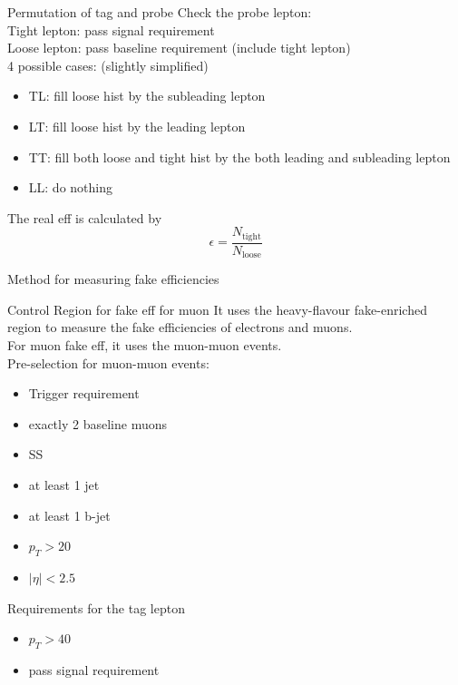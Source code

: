 \documentclass[mathserif,serif]{beamer}
\begin{document}
\begin{frame}{Permutation of tag and probe}
Check the probe lepton: \\
Tight lepton: pass signal requirement \\
Loose lepton: pass baseline requirement (include tight lepton) \\
4 possible cases: (slightly simplified)
\begin{itemize}
\item TL: fill loose hist by the subleading lepton
\item LT: fill loose hist by the leading lepton
\item TT: fill both loose and tight hist by the both leading and subleading lepton
\item LL: do nothing
\end{itemize}
The real eff is calculated by
\begin{equation*}
\epsilon = \frac{N_{\text{tight}}}{N_{\text{loose}}}
\end{equation*}
\end{frame}

\begin{frame}
\begin{center}
\huge
Method for measuring fake efficiencies
\end{center}
\end{frame}

\begin{frame}{Control Region for fake eff for muon}
It uses the heavy-flavour fake-enriched region to measure the fake efficiencies of electrons and muons. \\
For muon fake eff, it uses the muon-muon events. \\
Pre-selection for muon-muon events:
\begin{itemize}
\item Trigger requirement
\item exactly 2 baseline muons
\item SS
\item at least 1 jet
\item at least 1 b-jet
\item $p_T > 20$
\item $|\eta| < 2.5$
\end{itemize}
Requirements for the tag lepton
\begin{itemize}
\item $p_T > 40$
\item pass signal requirement
\end{itemize}
\end{frame}
\end{document}
